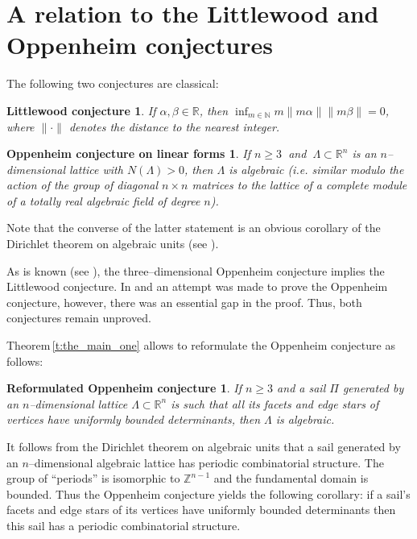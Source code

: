 \documentclass[11pt]{article}
\theoremstyle{definition}
\theoremstyle{remark}
\theoremstyle{plain}
\newtheorem*{littlewood}{Littlewood conjecture}
\newtheorem*{oppenheim}{Oppenheim conjecture on linear forms}
\newtheorem*{sailed_oppenheim}{Reformulated Oppenheim conjecture}
\renewcommand{\geq}{\geqslant}
\newcommand{\sail}{\Pi}
\newcommand{\La}{\Lambda}
\newcommand{\R}{\mathbb{R}}
\newcommand{\Z}{\mathbb{Z}}
\newcommand{\N}{\mathbb{N}}
\begin{document}
  \section{A relation to the Littlewood and Oppenheim conjectures}




  The following two conjectures are classical:

  \begin{littlewood}
    If $\alpha,\beta\in\R$, then $\inf_{m\in\N}m\|m\alpha\|\|m\beta\|=0$, where
    $\|\cdot\|$ denotes the distance to the nearest integer.
  \end{littlewood}

  \begin{oppenheim}
    If $n\geq 3\ $ and $\ \La\subset\R^n$ is an $n$--dimensional lattice with $N(\La)>0$,
    then $\La$ is algebraic (i.e. similar modulo the action of the group of diagonal
    $n\times n$ matrices
    to the lattice of a complete module of a totally real algebraic field of degree $n$).
  \end{oppenheim}

  Note that the converse of the latter statement is an obvious corollary of the Dirichlet
  theorem on algebraic units (see \cite{borevich_shafarevich}).

  As is known (see \cite{cassels_swinnerton_dyer}), the three--dimensional Oppenheim
  conjecture implies the Littlewood conjecture. In \cite{skubenko_3dim} and
  \cite{skubenko_ndim} an attempt was made to prove the Oppenheim conjecture, however, there
  was an essential gap in the proof. Thus, both conjectures remain unproved.

  Theorem\,\ref{t:the_main_one} allows to reformulate the Oppenheim conjecture as follows:

  \begin{sailed_oppenheim}
    If $n\geq 3$ and a sail $\sail$ generated by an $n$--di\-men\-sional lattice
    $\La\subset\R^n$ is such that all its facets and edge stars of vertices have uniformly
    bounded determinants, then $\La$ is algebraic.
  \end{sailed_oppenheim}

  It follows from the Dirichlet theorem on algebraic units that a sail generated by an
  $n$--di\-men\-sional algebraic lattice has periodic combinatorial structure. The group of
  ``periods'' is isomorphic to $\Z^{n-1}$ and the fundamental domain is bounded. Thus the
  Oppenheim conjecture yields the following corollary: if a sail's facets and edge stars of
  its vertices have uniformly bounded determinants then this sail has a periodic
  combinatorial structure.
\end{document}
